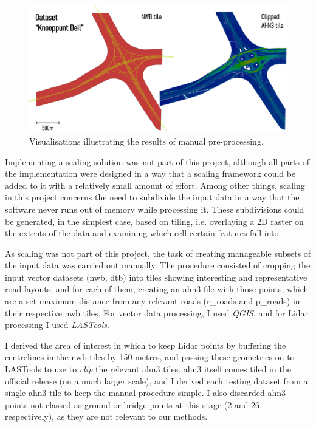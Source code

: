 \begin{figure}
    \centering
    \includegraphics[width=\linewidth]{final_report/figs/manualpreprocessing.png}
    \caption{Visualisations illustrating the results of manual pre-processing.}
    \label{fig:manualpreprocessing}
\end{figure}

Implementing a scaling solution was not part of this project, although all parts of the implementation were designed in a way that a scaling framework could be added to it with a relatively small amount of effort. Among other things, scaling in this project concerns the need to subdivide the input data in a way that the software never runs out of memory while processing it. These subdivisions could be generated, in the simplest case, based on tiling, i.e. overlaying a 2D raster on the extents of the data and examining which cell certain features fall into.

As scaling was not part of this project, the task of creating manageable subsets of the input data was carried out manually. The procedure consisted of cropping the input vector datasets (\ac{nwb}, \ac{dtb}) into tiles showing interesting and representative road layouts, and for each of them, creating an \ac{ahn3} file with those points, which are a set maximum distance from any relevant roads (\ac{r_roads} and \ac{p_roads}) in their respective \ac{nwb} tiles. For vector data processing, I used \textit{QGIS}, and for Lidar processing I used \textit{LASTools}.

I derived the area of interest in which to keep Lidar points by buffering the centrelines in the \ac{nwb} tiles by 150 metres, and passing these geometries on to LASTools to use to \textit{clip} the relevant \ac{ahn3} tiles. \ac{ahn3} itself comes tiled in the official release (on a much larger scale), and I derived each testing dataset from a single \ac{ahn3} tile to keep the manual procedure simple. I also discarded \ac{ahn3} points not classed as ground or bridge points at this stage (2 and 26 respectively), as they are not relevant to our methods.

